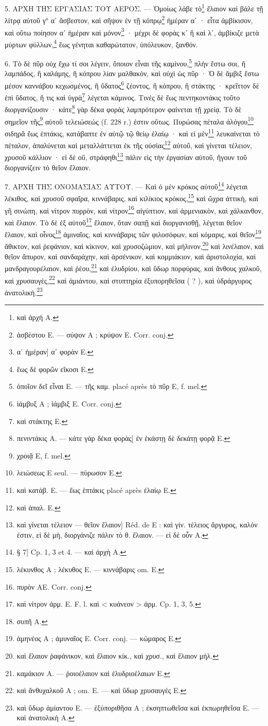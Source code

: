 \documentclass[a4paper, 11pt, oneside, polutonikogreek, french]{article}
\begin{document}
5. ΑΡΧΗ ΤΗΣ ΕΡΓΑΣΙΑΣ ΤΟΥ ΑΕΡΟΣ. --- Ὁμοίως λάβε τὸ\footnote{καὶ ἀρχὴ A.} ἔλαιον καὶ βάλε τῇ λίτρᾳ αὐτοῦ γ° αʹ ἄσβεστον, καὶ σῆψον ἐν τῇ κόπρῳ\footnote{ἀσβέστου E. --- σύψον A ; κρύψον E. Corr. conj.} ἡμέραν αʹ · εἶτα ἀμβίκισον, καὶ οὕτω ποίησον αʹ ἡμέραν καὶ μόνον\footnote{αʹ ἡμέραν] αʹ φορὰν E.} · μέχρι δὲ φορὰς κʹ ἢ καὶ λʹ, ἀμβίκιζε μετὰ μύρτων φύλλων,\footnote{ἕως δὲ φορῶν εἴκοσι E.} ἕως γένηται καθαρώτατον, ὑπόλευκον, ξανθόν.

6. Τὸ δὲ πῦρ οὐχ ἔχω τί σοι λέγειν, ὅποιον εἶναι τῆς καμίνου,\footnote{ὁποῖον δεῖ εἶναι E. --- τῆς καμ. placé après τὸ πῦρ E, f. mel.} πλὴν ἔστω σοι, ἢ λαμπάδος, ἢ καλάμης, ἢ κόπρου λίαν μαλθακὸν, καὶ οὐχὶ ὡς πῦρ · Ὁ δὲ ἄμβιξ ἔστω μέσον καννάβου κεχωσμένος, ἢ ὕδατος\footnote{ἰάμβυξ A ; ἰάμβιξ E. Corr. conj.} ζέοντος, ἢ κόπρου, ἢ στάκτης · κρεῖττον δὲ ἐπὶ ὕδατος, ἥ τις καὶ ὑγρὰ\footnote{καὶ στάκτης E.} λέγεται κάμινος. Τινὲς δὲ ἕως πεντηκοντάκις τοῦτο διοργανίζουσιν · κάτε\footnote{πενιντάκις A. --- κάτε γὰρ δέκα φορὰς] ἐν ἑκάστῃ δὲ δεκάτῃ φορᾷ E.} γὰρ δέκα φορὰς λαμπρότερον φαίνεται τῇ χρείᾳ. Τὸ δὲ σημεῖον τῆς\footnote{χροιᾷ E, f. mel.} αὐτοῦ τελειώσεώς (f. 228 r.) ἐστιν οὕτως. Πυρώσας πέταλα ἀλόγου\footnote{λειώσεως E seul. --- πύρωσον E.} σιδηρᾶ ἕως ἑπτάκις, κατάβαπτε ἐν αὐτῷ τῷ θείῳ ἐλαίῳ · καὶ εἰ μὲν\footnote{καὶ κατάβ. E. --- ἕως ἑπτάκις placé après ἐλαίῳ E.} λευκαίνεται τὸ πέταλον, ἁπαλύνεται καὶ μεταλλάττεται ἐκ τῆς οὐσίας\footnote{καὶ ἁπαλ. E.} αὐτοῦ, καὶ γίνεται τέλειον, χρυσοῦ κάλλιον · εἰ δὲ οὔ, στράφηθι\footnote{καὶ γίνεται τέλειον --- θεῖον ἔλαιον] Réd. de E : καὶ γίν. τέλειος ἄργυρος, καλόν ἐστιν, εἰ δὲ μὴ, διοργάνιζε πάλιν τὸ θ. ἔλαιον. --- εἰ δὲ οὖν A.} πάλιν εἰς τὴν ἐργασίαν αὐτοῦ, ἤγουν τοῦ διοργανίζειν τὸ θεῖον ἔλαιον.

7. ΑΡΧΗ ΤΗΣ ΟΝΟΜΑΣΙΑΣ ΑΥΤΟΥ. --- Καὶ ὁ μὲν κρόκος αὐτοῦ\footnote{§ 7] Cp. 1, 3 et 4. --- καὶ ἀρχὴ A.} λέγεται λέκιθος, καὶ χρυσοῦ σφαῖρα, κιννάβαρις, καὶ κιλίκιος κρόκος,\footnote{λέκυνθος A ; λέκυθος E. --- κιννάβαρις om. E.} καὶ ὤχρα ἀττικὴ, καὶ γῆ σινώπη, καὶ νίτρον πυρρὸν, καὶ νίτρον\footnote{πυρὸν AE. Corr. conj.} αἰγύπτιον, καὶ ἀρμενιακὸν, καὶ χάλκανθον, καὶ ἔλαιον. Τὸ δὲ ἐξ αὐτοῦ\footnote{καὶ νίτρον ἀρμ. E. F. l. καὶ < κυάνεον > ἀρμ. Cp. 1, 3, 5.} ἔλαιον, ὅταν σαπῇ καὶ διοργανισθῇ, λέγεται θεῖον ἔλαιον, καὶ οἶνος\footnote{συπῆ A.} ἀμιναῖος, καὶ κιννάβαρις τῶν φιλοσόφων, καὶ κόμαρις, καὶ θεῖον\footnote{ἀμηνέος A ; ἀμυναῖος E. Corr. conj. --- κώμαρος E.} ἄθικτον, καὶ ῥεφάνιον, καὶ κίκινον, καὶ χρυσοζώμιον, καὶ μήλινον,\footnote{καὶ ἔλαιον ῥαφάνικον, καὶ ἔλαιον κίκ., καὶ χρυσ., καὶ ἔλαιον μήλ.} καὶ λινέλαιον, καὶ θεῖον ἄπυρον, καὶ σανδαράχην, καὶ ἀρσένικον, καὶ κομμιάκιον, καὶ ἀριστολοχία, καὶ μανδραγουρέλαιον, καὶ ῥέου,\footnote{καμάκιον A. --- ῥοιοέλαιον καὶ ἐλυδριοέλαιων E.} καὶ ἐλυδρίου, καὶ ὕδωρ πορφύρας, καὶ ἄνθους χαλκοῦ, καὶ χρυσαυγὲς,\footnote{καὶ ἄνθυχαλκοῦ A ; om. E. --- καὶ ὕδωρ χρυσαυγὲς E.} καὶ ἀμιάντου, καὶ στυπτηρία ἐξυπορηθεῖσα ( ? ), καὶ ὑδράργυρος ἀνατολική.\footnote{καὶ ὕδωρ ἀμίαντου E. --- ἐξύποριθῆσα A ; ἐκσηπτωθεῖσα καὶ ἐκπωρηθεῖσα E. --- καὶ ἀνατολικὴ A.}
\end{document}
